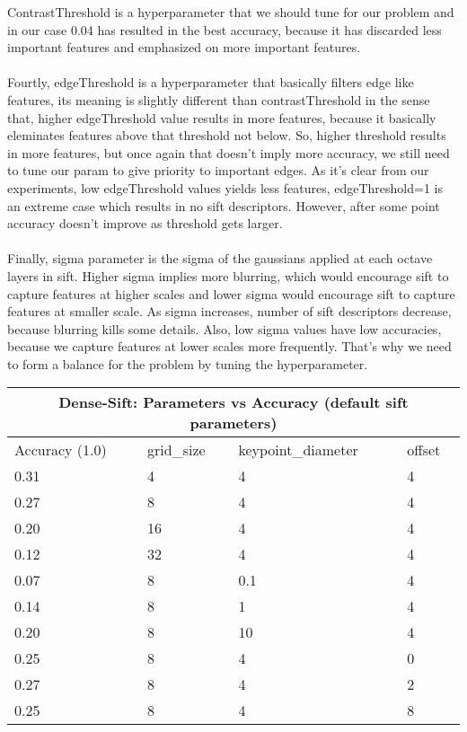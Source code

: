 \documentclass[12pt]{article}
\begin{document}
\begin{center}
        ContrastThreshold is a hyperparameter that we should tune for our problem and in our case 0.04 has resulted in the best accuracy, because it has discarded less important features and emphasized on more important features.
        \\~\\
        Fourtly, edgeThreshold is a hyperparameter that basically filters edge like features, its meaning is slightly different than contrastThreshold in the sense that, higher edgeThreshold value results in more features, because it basically eleminates features above that threshold not below.
        So, higher threshold results in more features, but once again that doesn't imply more accuracy, we still need to tune our param to give priority to important edges.
        As it's clear from our experiments, low edgeThreshold values yields less features, edgeThreshold=1 is an extreme case which results in no sift descriptors. 
        However, after some point accuracy doesn't improve as threshold gets larger.
        \\~\\
        Finally, sigma parameter is the sigma of the gaussians applied at each octave layers in sift.
        Higher sigma implies more blurring, which would encourage sift to capture features at higher scales
        and lower sigma would encourage sift to capture features at smaller scale. 
        As sigma increases, number of sift descriptors decrease, because blurring kills some details.
        Also, low sigma values have low accuracies, because we capture features at lower scales more frequently.
        That's why we need to form a balance for the problem by tuning the hyperparameter.
       
        \vspace*{0.5cm}
        \begin{tabular}{ |p{1.5cm}||p{3cm}|p{3cm}|p{3cm}| }
            \hline
            \multicolumn{4}{|c|}{Dense-Sift: Parameters vs Accuracy (default sift parameters)} \\
            \hline
            Accuracy (1.0) & grid\_size & keypoint\_diameter & offset \\
            \hline
            0.31 & 4 & 4 & 4 \\ %
            0.27 & 8 & 4 & 4 \\ %
            0.20 & 16 & 4 & 4 \\ %
            0.12 & 32 & 4 & 4 \\ %
            \hline
            \hline
            0.07 & 8 & 0.1 & 4 \\ 
            0.14 & 8 & 1 & 4 \\ 
            0.20 & 8 & 10 & 4 \\ 
            \hline
            \hline
            0.25 & 8 & 4 & 0 \\ 
            0.27 & 8 & 4 & 2 \\ 
            0.25 & 8 & 4 & 8 \\ 
            \hline
        \end{tabular}
        

\end{center}
\end{document}
